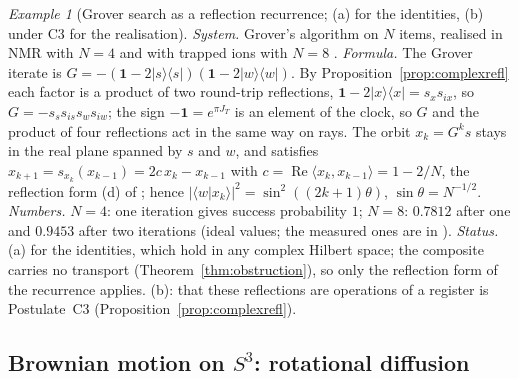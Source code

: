 \documentclass[aps,pra,onecolumn,superscriptaddress,nofootinbib,10pt]{revtex4-2}
\theoremstyle{definition}
\theoremstyle{remark}
\newtheorem{example}[theorem]{Example}
\begin{document}
\begin{example}[Grover search as a reflection recurrence; (a) for the identities, (b) under C3 for the realisation]\label{ex:grover}
\emph{System.}  Grover's algorithm \cite{ex-Grover97} on $N$ items, realised in NMR with $N=4$ \cite{ex-CGK98} and
with trapped ions with $N=8$ \cite{ex-Figgatt17}.
\emph{Formula.}  The Grover iterate is $G=-(\mathbf1-2|s\rangle\langle s|)(\mathbf1-2|w\rangle\langle w|)$.  By
Proposition~\ref{prop:complexrefl} each factor is a product of two round-trip reflections,
$\mathbf1-2|x\rangle\langle x|=s_xs_{ix}$, so $G=-s_ss_{is}s_ws_{iw}$; the sign $-\mathbf1=e^{\pi J_T}$ is an element of the
clock, so $G$ and the product of four reflections act in the same way on rays.  The orbit $x_k=G^ks$ stays
in the real plane spanned by $s$ and $w$, and satisfies $x_{k+1}=s_{x_k}(x_{k-1})=2c\,x_k-x_{k-1}$ with
$c=\operatorname{Re}\langle x_k,x_{k-1}\rangle=1-2/N$, the reflection form (d) of \cite[Thm.~6.2]{PaperI}; hence
$\lvert\langle w|x_k\rangle\rvert^2=\sin^2((2k+1)\theta)$, $\sin\theta=N^{-1/2}$.
\emph{Numbers.}  $N=4$: one iteration gives success probability $1$; $N=8$: $0.7812$ after one and $0.9453$
after two iterations (ideal values; the measured ones are in \cite{ex-Figgatt17}).
\emph{Status.}  (a) for the identities, which hold in any complex Hilbert space; the composite carries no
transport (Theorem~\ref{thm:obstruction}), so only the reflection form of the recurrence applies.  (b): that
these reflections are operations of a register is Postulate~C3 (Proposition~\ref{prop:complexrefl}).
\end{example}

\subsection{Brownian motion on $S^3$: rotational diffusion}
\end{document}
